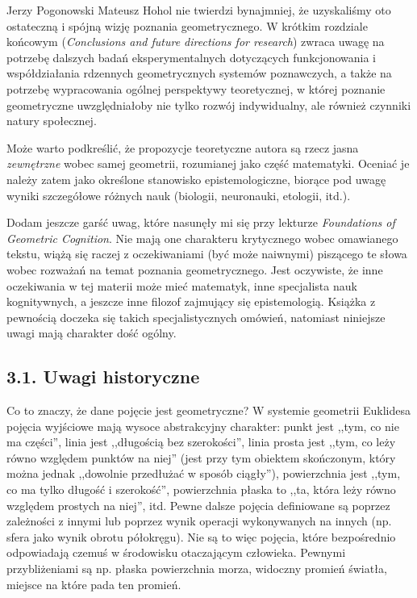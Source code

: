 \begin{newrevengenv}{Jerzy Pogonowski}
Mateusz Hohol nie twierdzi bynajmniej, że uzyskaliśmy oto
ostateczną i spójną wizję poznania geometrycznego. W krótkim
rozdziale końcowym ({\em Conclusions and future directions for
research}) zwraca uwagę na potrzebę dalszych badań
eksperymentalnych dotyczących funkcjonowania i współdziałania
rdzennych geometrycznych systemów poznawczych, a także na potrzebę
wypracowania ogólnej perspektywy teoretycznej, w której poznanie
geometryczne uwzględniałoby nie tylko rozwój indywidualny, ale
również czynniki natury społecznej.

Może warto podkreślić, że propozycje teoretyczne autora są rzecz
jasna {\em zewnętrzne} wobec samej geometrii, rozumianej jako
część matematyki. Oceniać je należy zatem jako określone
stanowisko epistemologiczne, biorące pod uwagę wyniki szczegółowe
różnych nauk (biologii, neuronauki, etologii, itd.).

Dodam jeszcze garść uwag, które nasunęły mi się przy lekturze {\em
Foundations of Geometric Cognition}. Nie mają one charakteru
krytycznego wobec omawianego tekstu, wiążą się raczej z
oczekiwaniami (być może naiwnymi) piszącego te słowa wobec
rozważań na temat poznania geometrycznego. Jest oczywiste, że inne
oczekiwania w tej materii może mieć matematyk, inne specjalista
nauk kognitywnych, a jeszcze inne filozof zajmujący się
epistemologią. Książka z pewnością doczeka się takich
specjalistycznych omówień, natomiast niniejsze uwagi mają
charakter dość ogólny.

\subsection{3.1. Uwagi historyczne}

Co to znaczy, że dane pojęcie jest geometryczne? W systemie
geometrii Euklidesa pojęcia wyjściowe mają wysoce abstrakcyjny
charakter: punkt jest ,,tym, co nie ma części'', linia jest
,,długością bez szerokości'', linia prosta jest ,,tym, co leży
równo względem punktów na niej'' (jest przy tym obiektem
skończonym, który można jednak ,,dowolnie przedłużać w sposób
ciągły''), powierzchnia jest ,,tym, co ma tylko długość i
szerokość'', powierzchnia płaska to ,,ta, która leży równo
względem prostych na niej'', itd. Pewne dalsze pojęcia definiowane
są poprzez zależności z innymi lub poprzez wynik operacji
wykonywanych na innych (np. sfera jako wynik obrotu półokręgu).
Nie są to więc pojęcia, które bezpośrednio odpowiadają czemuś w
środowisku otaczającym człowieka. Pewnymi przybliżeniami są np.
płaska powierzchnia morza, widoczny promień światła, miejsce na
które pada ten promień.


\end{newrevengenv}
